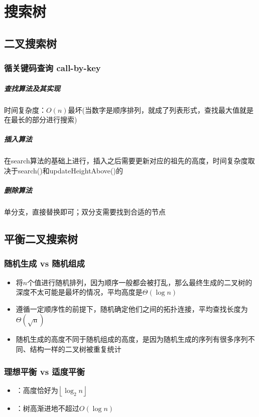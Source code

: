\chapter{搜索树}
\section{二叉搜索树}
\subsection{循关键码查询 call-by-key}
\paragraph{查找算法及其实现}
时间复杂度：$O(n)$最坏(当数字是顺序排列，就成了列表形式，查找最大值就是在最长的部分进行搜索)

\paragraph{插入算法}
在search算法的基础上进行，插入之后需要更新对应的祖先的高度，时间复杂度取决于search()和updateHeightAbove()的

\paragraph{删除算法}
单分支，直接替换即可；双分支需要找到合适的节点

\section{平衡二叉搜索树}
\subsection{随机生成 vs 随机组成}
\begin{itemize}
\item {}将$n$个值进行随机排列，因为顺序一般都会被打乱，那么最终生成的二叉树的深度不太可能是最坏的情况，平均高度是$\Theta(\log n)$
\item {}遵循一定顺序性的前提下，随机确定他们之间的拓扑连接，平均查找长度为 $\Theta(\sqrt{\mathrm{n}})$
\item 随机生成的高度不同于随机组成的高度，是因为随机生成的序列有很多序列不同、结构一样的二叉树被重复统计
\end{itemize}

\subsection{理想平衡 vs 适度平衡}
\begin{itemize}
\item {}：高度恰好为$\left\lfloor\log _{2} n\right\rfloor$
\item {}：树高渐进地不超过$O(\log n)$
\end{itemize}

